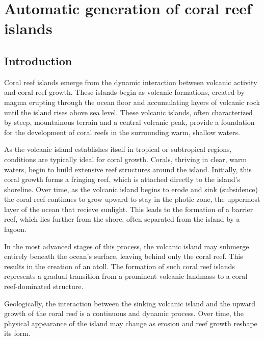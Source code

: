 \chapter{Automatic generation of coral reef islands}
\label{chap:coral-island}
\minitoc

\section{Introduction}
\label{sec:coral-island_introduction}

Coral reef islands emerge from the dynamic interaction between volcanic activity and coral reef growth. These islands begin as volcanic formations, created by magma erupting through the ocean floor and accumulating layers of volcanic rock until the island rises above sea level. These volcanic islands, often characterized by steep, mountainous terrain and a central volcanic peak, provide a foundation for the development of coral reefs in the surrounding warm, shallow waters.

As the volcanic island establishes itself in tropical or subtropical regions, conditions are typically ideal for coral growth. Corals, thriving in clear, warm waters, begin to build extensive reef structures around the island. Initially, this coral growth forms a fringing reef, which is attached directly to the island's shoreline. Over time, as the volcanic island begins to erode and sink (subsidence) the coral reef continues to grow upward to stay in the photic zone, the uppermost layer of the ocean that recieve sunlight. This leads to the formation of a barrier reef, which lies further from the shore, often separated from the island by a lagoon.

In the most advanced stages of this process, the volcanic island may submerge entirely beneath the ocean's surface, leaving behind only the coral reef. This results in the creation of an atoll. The formation of such coral reef islands represents a gradual transition from a prominent volcanic landmass to a coral reef-dominated structure. 

Geologically, the interaction between the sinking volcanic island and the upward growth of the coral reef is a continuous and dynamic process. Over time, the physical appearance of the island may change as erosion and reef growth reshape its form.


